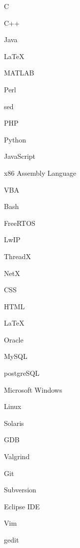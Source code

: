 \documentclass[10pt]{article}
\begin{document}
\begin{technicalSkills}

{\item C
\item C++
\item Java
\item \LaTeX
\item MATLAB
\item Perl
\item sed
\item PHP
\item Python
\item JavaScript
\item x86 Assembly Language
\item VBA}

{\item Bash}

{\item FreeRTOS
\item LwIP
\item ThreadX
\item NetX}

{\item CSS
\item HTML}

{\item \LaTeX}

{\item Oracle
\item MySQL
\item postgreSQL}

{\item Microsoft Windows
\item Linux
\item Solaris}

{\item GDB
\item Valgrind}

{\item Git
\item Subversion
\item Eclipse IDE
\item Vim
\item gedit}

\end{technicalSkills}
\end{document}
